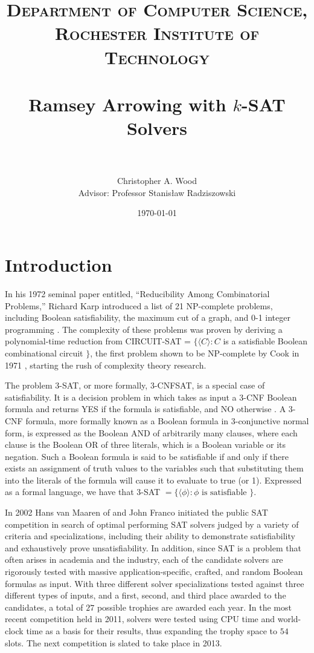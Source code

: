 \documentclass[paper=a4, fontsize=11pt]{scrartcl} %
\title{	
\normalfont \normalsize 
\textsc{Department of Computer Science, Rochester Institute of Technology} \\ [25pt] %
\horrule{2pt} \\[0.4cm] %
\huge Ramsey Arrowing with $k$-SAT Solvers\\ 
\horrule{2pt} \\[0.5cm] %
}
\author{Christopher A. Wood \\ Advisor: Professor Stanis{\l}aw Radziszowski} %
\date{\normalsize \today} %
\begin{document}
\maketitle %

\section{Introduction}
In his 1972 seminal paper entitled, ``Reducibility Among Combinatorial Problems,'' Richard Karp introduced a 
list of 21 NP-complete problems, including Boolean satisfiability, the maximum cut of a graph, 
and 0-1 integer programming \cite{karp72}. The complexity of these problems was proven by deriving
a polynomial-time reduction from CIRCUIT-SAT = $\{\langle C \rangle : C$ is a satisfiable Boolean combinational
circuit $\}$, the first problem shown to be NP-complete by Cook in 1971 \cite{cook71-np}, starting
the rush of complexity theory research. 

The problem 3-SAT, or more formally, 3-CNFSAT, is a special case of satisfiability.
It is a decision problem in which takes as input a 3-CNF Boolean formula and returns YES if 
the formula is satisfiable, and NO otherwise \cite{clrs90-algorithms}. A 3-CNF formula, more formally known as a Boolean 
formula in 3-conjunctive normal form, is expressed as the Boolean AND of arbitrarily many clauses,
where each clause is the Boolean OR of three literals, which is a Boolean variable or its negation. 
Such a Boolean formula is said to be satisfiable if and only if there exists an assignment of truth 
values to the variables such that substituting them into the literals of the formula will cause it 
to evaluate to true (or 1). Expressed as a formal language, we have that 
3-SAT $= \{\langle \phi \rangle : \phi \text{ is satisfiable }\}$.

In 2002 Hans van Maaren of and John Franco initiated the public SAT competition in
search of optimal performing SAT solvers judged by a variety of criteria and specializations, 
including their ability to demonstrate satisfiability and exhaustively prove unsatisfiability.
In addition, since SAT is a problem that often arises in academia and the industry, 
each of the candidate solvers are rigorously tested with massive application-specific, 
crafted, and random Boolean formulas as input. With three different solver
specializations tested against three different types of inputs, and a first, second, 
and third place awarded to the candidates, a total of $27$ possible trophies are
awarded each year. In the most recent competition held in 2011, solvers were
tested using CPU time and world-clock time as a basis for their results, thus expanding
the trophy space to $54$ slots. The next competition is slated to take place in 2013. 
\end{document}
